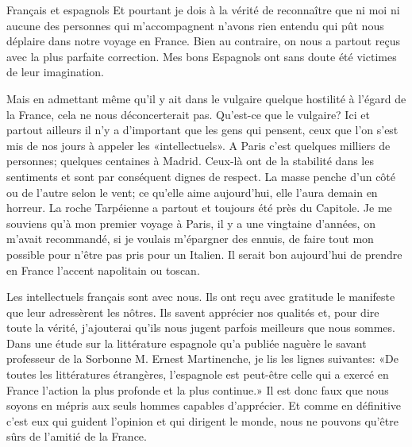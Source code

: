 \begin{chapter}{Français et espagnols}
Et pourtant je dois à la vérité de reconnaître que ni moi ni aucune des
personnes qui m'accompagnent n'avons rien entendu qui pût nous déplaire
dans notre voyage en France. Bien au contraire, on nous a partout reçus
avec la plus parfaite correction. Mes bons Espagnols ont sans doute été
victimes de leur imagination.

Mais en admettant même qu'il y ait dans le vulgaire quelque hostilité à
l'égard de la France, cela ne nous déconcerterait pas. Qu'est-ce que le
vulgaire? Ici et partout ailleurs il n'y a d'important que les gens qui
pensent, ceux que l'on s'est mis de nos jours à appeler les
«intellectuels». A Paris c'est quelques milliers de personnes; quelques
centaines à Madrid. Ceux-là ont de la stabilité dans les sentiments et
sont par conséquent dignes de respect. La masse penche d'un côté ou de
l'autre selon le vent; ce qu'elle aime aujourd'hui, elle l'aura demain
en horreur. La roche Tarpéienne a partout et toujours été près du
Capitole. Je me souviens qu'à mon premier voyage à Paris, il y a une
vingtaine d'années, on m'avait recommandé, si je voulais m'épargner des
ennuis, de faire tout mon possible pour n'être pas pris pour un Italien.
Il serait bon aujourd'hui de prendre en France l'accent napolitain ou
toscan.

Les intellectuels français sont avec nous. Ils ont reçu avec gratitude
le manifeste que leur adressèrent les nôtres. Ils savent apprécier nos
qualités et, pour dire toute la vérité, j'ajouterai qu'ils nous jugent
parfois meilleurs que nous sommes. Dans une étude sur la littérature
espagnole qu'a publiée naguère le savant professeur de la Sorbonne M.
Ernest Martinenche, je lis les lignes suivantes: «De toutes les
littératures étrangères, l'espagnole est peut-être celle qui a exercé en
France l'action la plus profonde et la plus continue.» Il est donc faux
que nous soyons en mépris aux seuls hommes capables d'apprécier. Et
comme en définitive c'est eux qui guident l'opinion et qui dirigent le
monde, nous ne pouvons qu'être sûrs de l'amitié de la France.

\end{chapter}



